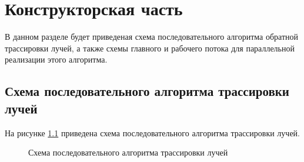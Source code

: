 \chapter{Конструкторская часть}

В данном разделе будет приведеная схема последовательного алгоритма обратной трассировки лучей, а также схемы главного и рабочего потока для параллельной реализации этого алгоритма.

\section{Схема последовательного алгоритма трассировки лучей}

На рисунке \ref{fig:trass_simple} приведена схема последовательного алгоритма трассировки лучей.

\newpage
\begin{figure}[h!]
	
	
	\caption{Схема последовательного алгоритма трассировки лучей}
	
	\label{fig:trass_simple}
	
\end{figure}

